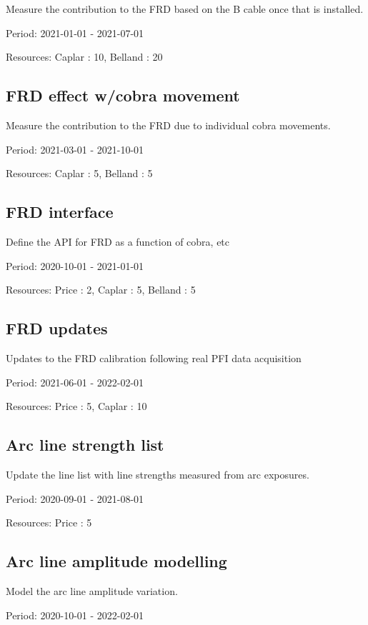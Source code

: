 Measure the contribution to the FRD based on the B cable once that is installed.

Period: 2021-01-01 - 2021-07-01

Resources: Caplar : 10, Belland : 20

\subsection{FRD effect w/cobra movement}

Measure the contribution to the FRD due to individual cobra movements.

Period: 2021-03-01 - 2021-10-01

Resources: Caplar : 5, Belland : 5

\subsection{FRD interface}

Define the API for FRD as a function of cobra, etc

Period: 2020-10-01 - 2021-01-01

Resources: Price : 2, Caplar : 5, Belland : 5

\subsection{FRD updates}

Updates to the FRD calibration following real PFI data acquisition

Period: 2021-06-01 - 2022-02-01

Resources: Price : 5, Caplar : 10

\subsection{Arc line strength list}

Update the line list with line strengths measured from arc exposures.

Period: 2020-09-01 - 2021-08-01

Resources: Price : 5

\subsection{Arc line amplitude modelling}

Model the arc line amplitude variation.

Period: 2020-10-01 - 2022-02-01


